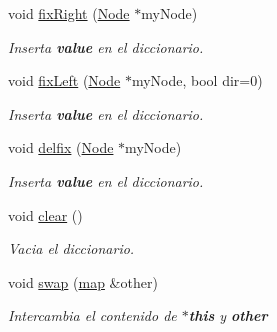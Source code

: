 \begin{Indent}
\begin{DoxyCompactItemize}
void \hyperlink{classaed2_1_1map_ae908761d06411046290cf49a5e0618bd_ae908761d06411046290cf49a5e0618bd}{fix\+Right} (\hyperlink{structaed2_1_1map_1_1Node}{Node} $\ast$my\+Node)
\begin{DoxyCompactList}\small\item\em Inserta {\bfseries value} en el diccionario. \end{DoxyCompactList}\item 
void \hyperlink{classaed2_1_1map_ae69c26a9d27f538124cd827646e56feb_ae69c26a9d27f538124cd827646e56feb}{fix\+Left} (\hyperlink{structaed2_1_1map_1_1Node}{Node} $\ast$my\+Node, bool dir=0)
\begin{DoxyCompactList}\small\item\em Inserta {\bfseries value} en el diccionario. \end{DoxyCompactList}\item 
void \hyperlink{classaed2_1_1map_a056322ff63d37b43d042ffa0378c9fd2_a056322ff63d37b43d042ffa0378c9fd2}{delfix} (\hyperlink{structaed2_1_1map_1_1Node}{Node} $\ast$my\+Node)
\begin{DoxyCompactList}\small\item\em Inserta {\bfseries value} en el diccionario. \end{DoxyCompactList}\item 
void \hyperlink{classaed2_1_1map_a2bfa5165825979bf2431db55bc6bc9ca_a2bfa5165825979bf2431db55bc6bc9ca}{clear} ()
\begin{DoxyCompactList}\small\item\em Vacia el diccionario. \end{DoxyCompactList}\item 
void \hyperlink{classaed2_1_1map_a43ddb71cc91e5c6021a7a1f243d6cc4a_a43ddb71cc91e5c6021a7a1f243d6cc4a}{swap} (\hyperlink{classaed2_1_1map}{map} \&other)
\begin{DoxyCompactList}\small\item\em Intercambia el contenido de {\bfseries $\ast$this} y {\bfseries other} \end{DoxyCompactList}\end{DoxyCompactItemize}
\end{Indent}
